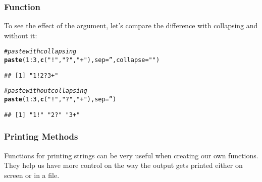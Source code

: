 \documentclass[12pt]{beamer}\usepackage[]{graphicx}\usepackage[]{color}
\makeatletter
\newcommand{\hlnum}[1]{\textcolor[rgb]{0.686,0.059,0.569}{#1}}%
\newcommand{\hlstr}[1]{\textcolor[rgb]{0.192,0.494,0.8}{#1}}%
\newcommand{\hlcom}[1]{\textcolor[rgb]{0.678,0.584,0.686}{\textit{#1}}}%
\newcommand{\hlopt}[1]{\textcolor[rgb]{0,0,0}{#1}}%
\newcommand{\hlstd}[1]{\textcolor[rgb]{0.345,0.345,0.345}{#1}}%
\newcommand{\hlkwc}[1]{\textcolor[rgb]{0.333,0.667,0.333}{#1}}%
\newcommand{\hlkwd}[1]{\textcolor[rgb]{0.737,0.353,0.396}{\textbf{#1}}}%
\newenvironment{kframe}{%
 \def\at@end@of@kframe{}%
 \ifinner\ifhmode%
  \def\at@end@of@kframe{\end{minipage}}%
  \begin{minipage}{\columnwidth}%
 \fi\fi%
 \def\FrameCommand##1{\hskip\@totalleftmargin \hskip-\fboxsep
 \colorbox{shadecolor}{##1}\hskip-\fboxsep
     \hskip-\linewidth \hskip-\@totalleftmargin \hskip\columnwidth}%
 \MakeFramed {\advance\hsize-\width
   \@totalleftmargin\z@ \linewidth\hsize
   \@setminipage}}%
 {\par\unskip\endMakeFramed%
 \at@end@of@kframe}
\newenvironment{knitrout}{}{} %
\makeatother
\begin{document}
\begin{frame}[fragile]
\frametitle{Function }

To see the effect of the  argument, let's compare the difference with collapsing and without it:
\begin{knitrout}\footnotesize
{}\color{fgcolor}\begin{kframe}
\begin{alltt}
\hlcom{# paste with collapsing}
\hlkwd{paste}\hlstd{(}\hlnum{1}\hlopt{:}\hlnum{3}\hlstd{,} \hlkwd{c}\hlstd{(}\hlstr{"!"}\hlstd{,} \hlstr{"?"}\hlstd{,} \hlstr{"+"}\hlstd{),} \hlkwc{sep} \hlstd{=} \hlstr{''}\hlstd{,} \hlkwc{collapse} \hlstd{=} \hlstr{""}\hlstd{)}
\end{alltt}
\begin{verbatim}
## [1] "1!2?3+"
\end{verbatim}
\begin{alltt}
\hlcom{# paste without collapsing}
\hlkwd{paste}\hlstd{(}\hlnum{1}\hlopt{:}\hlnum{3}\hlstd{,} \hlkwd{c}\hlstd{(}\hlstr{"!"}\hlstd{,} \hlstr{"?"}\hlstd{,} \hlstr{"+"}\hlstd{),} \hlkwc{sep} \hlstd{=} \hlstr{''}\hlstd{)}
\end{alltt}
\begin{verbatim}
## [1] "1!" "2?" "3+"
\end{verbatim}
\end{kframe}
\end{knitrout}

\end{frame}


\begin{frame}
\begin{center}
\Huge{}
\end{center}
\end{frame}


\begin{frame}
\frametitle{Printing Methods}
Functions for printing strings can be very useful when creating our own functions. They help us have more control on the way the output gets printed either on screen or in a file.
\end{frame}

\end{document}
